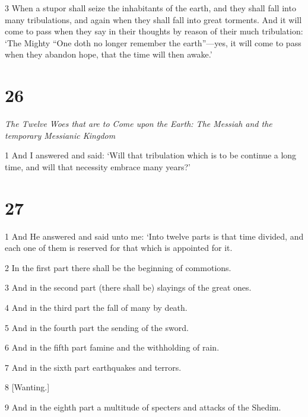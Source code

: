 \par 3 When a stupor shall seize the inhabitants of the earth, and they shall fall into many tribulations, and again when they shall fall into great torments. And it will come to pass when they say in their thoughts by reason of their much tribulation: ‘The Mighty “One doth no longer remember the earth”—yes, it will come to pass when they abandon hope, that the time will then awake.’

\chapter{26}

\par \textit{The Twelve Woes that are to Come upon the Earth: The Messiah and the temporary Messianic Kingdom}

\par 1 And I answered and said: ‘Will that tribulation which is to be continue a long time, and will that necessity embrace many years?’

\chapter{27}

\par 1 And He answered and said unto me: ‘Into twelve parts is that time divided, and each one of them is reserved for that which is appointed for it. 

\par 2 In the first part there shall be the begin­ning of commotions. 

\par 3 And in the second part (there shall be) slayings of the great ones. 

\par 4 And in the third part the fall of many by death. 

\par 5 And in the fourth part the sending of the sword. 

\par 6 And in the fifth part famine and the withholding of rain. 

\par 7 And in the sixth part earthquakes and terrors. 

\par 8 [Wanting.] 

\par 9 And in the eighth part a multitude of specters and attacks of the Shedim. 


